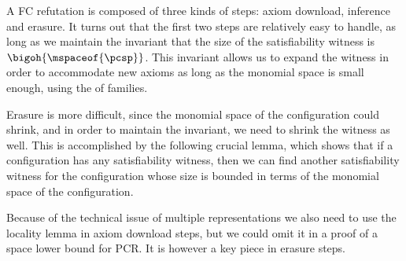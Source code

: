 A FC refutation is composed of three kinds of steps: axiom download, inference and erasure. It turns out that the first two steps are relatively easy to handle, as long as we maintain the invariant that the size of the satisfiability witness is $\bigoh{\mspaceof{\pcsp}}$. This invariant allows us to expand the witness in order to accommodate new axioms as long as the monomial space is small enough, using the \extensionproperty of \kextendibleNok families.

Erasure is more difficult, since the monomial space of the configuration could shrink, and in order to maintain the invariant, we need to shrink the witness as well. This is accomplished by the following crucial lemma, which shows that if a configuration has any satisfiability witness, then we can find another satisfiability witness for the configuration whose size is bounded in terms of the monomial space of the configuration.

Because of the technical issue of multiple representations we also need to use the locality lemma in axiom download steps, but we could omit it in a proof of a space lower bound for PCR. It is however a key piece in erasure steps.

